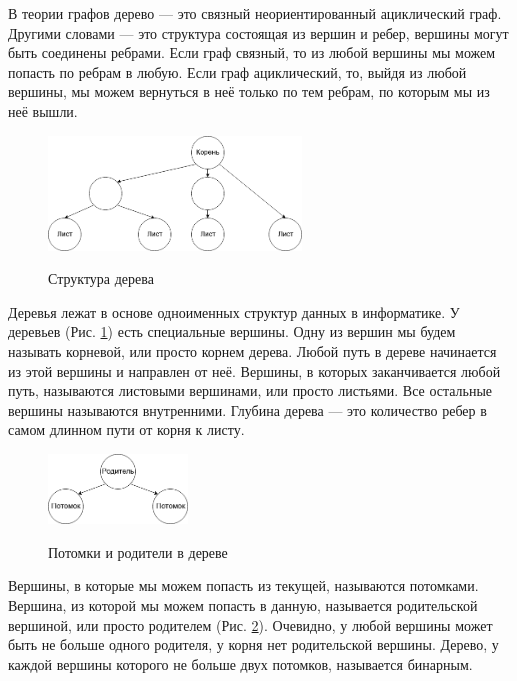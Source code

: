 \documentclass[12pt,a4paper]{article}
\newcommand{\figref}[1]{(Рис. \ref{#1})}
\begin{document}
В теории графов дерево --- это связный неориентированный ациклический граф. Другими словами --- это структура состоящая из вершин и ребер, вершины могут быть соединены ребрами. Если граф связный, то из любой вершины мы можем попасть по ребрам в любую. Если граф ациклический, то, выйдя из любой вершины, мы можем вернуться в неё только по тем ребрам, по которым мы из неё вышли.\par

\begin{figure}[h]
\centering
\includegraphics[width=0.6\textwidth]{../resources/simple_tree.png}
\label{fig:simpletree}
\caption{Структура дерева}
\end{figure}

Деревья лежат в основе одноименных структур данных в информатике. У деревьев \figref{fig:simpletree} есть специальные вершины. Одну из вершин мы будем называть корневой, или просто корнем дерева. Любой путь в дереве начинается из этой вершины и направлен от неё. Вершины, в которых заканчивается любой путь, называются листовыми вершинами, или просто листьями. Все остальные вершины называются внутренними. Глубина дерева --- это количество ребер в самом длинном пути от корня к листу.\par

\begin{figure}[h]
\centering
\includegraphics[width=0.33\textwidth]{../resources/parent_child.png}
\label{fig:parentchild}
\caption{Потомки и родители в дереве}
\end{figure}

Вершины, в которые мы можем попасть из текущей, называются потомками. Вершина, из которой мы можем попасть в данную, называется родительской вершиной, или просто родителем \figref{fig:parentchild}. Очевидно, у любой вершины может быть не больше одного родителя, у корня нет родительской вершины. Дерево, у каждой вершины которого не больше двух потомков, называется бинарным.\par
\end{document}
